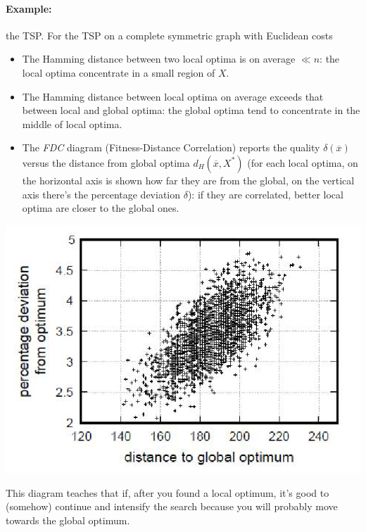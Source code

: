 \documentclass[11pt]{article}
\begin{document}
	\paragraph{Example:} the TSP. For the TSP on a complete symmetric graph with Euclidean costs
	\begin{itemize}
		\item The Hamming distance between two local optima is on average $\ll n$: the local optima concentrate in a small region of $X$.\\
		
		\item The Hamming distance between local optima on average exceeds that between local and global optima: the global optima tend to concentrate in the middle of local optima.\\
		
		\item The \textit{FDC} diagram (Fitness-Distance Correlation) reports the quality $\delta (\overline{x})$ versus the distance from global optima $d_H (\overline{x}, X^\ast)$ (for each local optima, on the horizontal axis is shown how far they are from the global, on the vertical axis there's the percentage deviation $\delta$): if they are correlated, better local optima are closer to the global ones.\\
	\end{itemize}
	\begin{center}
		\includegraphics[width=0.7\columnwidth]{img/TSP3}
	\end{center}
	
	This diagram teaches that if, after you found a local optimum, it's good to (somehow) continue and intensify the search because you will probably move towards the global optimum.\\
	
	\newpage
	
\end{document}
